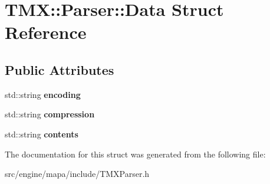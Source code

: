 \hypertarget{struct_t_m_x_1_1_parser_1_1_data}{}\section{T\+MX\+:\+:Parser\+:\+:Data Struct Reference}
\label{struct_t_m_x_1_1_parser_1_1_data}
\subsection*{Public Attributes}
\begin{DoxyCompactItemize}
\item 
std\+::string {\bfseries encoding}\hypertarget{struct_t_m_x_1_1_parser_1_1_data_a81a5cc3399b2675d6621ee7865f0a4f8}{}\label{struct_t_m_x_1_1_parser_1_1_data_a81a5cc3399b2675d6621ee7865f0a4f8}

\item 
std\+::string {\bfseries compression}\hypertarget{struct_t_m_x_1_1_parser_1_1_data_aebdceea109a2e11022a708cdd2a6595c}{}\label{struct_t_m_x_1_1_parser_1_1_data_aebdceea109a2e11022a708cdd2a6595c}

\item 
std\+::string {\bfseries contents}\hypertarget{struct_t_m_x_1_1_parser_1_1_data_ace1c81445b2f9ababe1f334c0706e409}{}\label{struct_t_m_x_1_1_parser_1_1_data_ace1c81445b2f9ababe1f334c0706e409}

\end{DoxyCompactItemize}


The documentation for this struct was generated from the following file\+:\begin{DoxyCompactItemize}
\item 
src/engine/mapa/include/T\+M\+X\+Parser.\+h\end{DoxyCompactItemize}
